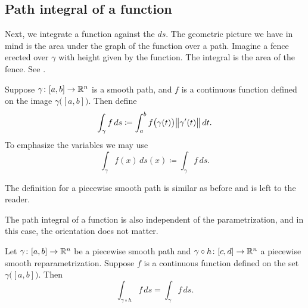 \subsection{Path integral of a function}

Next, we integrate a function against the
\emph{} $ds$.  The geometric picture we have in mind
is the area under the graph of the function over a path.
Imagine a fence erected over $\gamma$ with height given by the function.
The integral is the area of the fence.
See .
\begin{myfigureht}
\caption{A path $\gamma \colon [a,b] \to \R^2$ in the $xy$-plane (bold curve), and a function
$z=f(x,y)$ graphed above it in the $z$ direction.  The integral is the
shaded area depicted.\label{fig:fenceintegral}}
\end{myfigureht}

\begin{defn}
Suppose $\gamma \colon [a,b] \to {\mathbb{R}}^n$ is a smooth path, and $f$ is a
continuous function defined on the image $\gamma\bigl([a,b]\bigr)$.  Then
define
\begin{equation*}
\int_{\gamma} f \,ds \coloneqq
\int_a^b f\bigl( \gamma(t) \bigr) \bigl\lVert {\gamma'(t)} \bigr\rVert \, dt .
\end{equation*}
To emphasize the variables we may use
\begin{equation*}
\int_{\gamma} f(x) \,ds(x) \coloneqq \int_{\gamma} f \,ds .
\end{equation*}

The definition for a piecewise smooth path is similar as before and is left
to the reader.
\end{defn}

The path integral of a function is also independent of the parametrization,
and in this case, the orientation does not matter.

\begin{prop} \label{mv:prop:lineintrepararam}
Let $\gamma \colon [a,b] \to {\mathbb{R}}^n$ be a piecewise smooth path and
$\gamma \circ h \colon [c,d] \to {\mathbb{R}}^n$ a piecewise smooth reparametrization.
Suppose $f$ is a continuous function defined on the set
$\gamma\bigl([a,b]\bigr)$.  Then
\begin{equation*}
\int_{\gamma \circ h} f\, ds = \int_{\gamma} f\, ds .
\end{equation*}
\end{prop}

